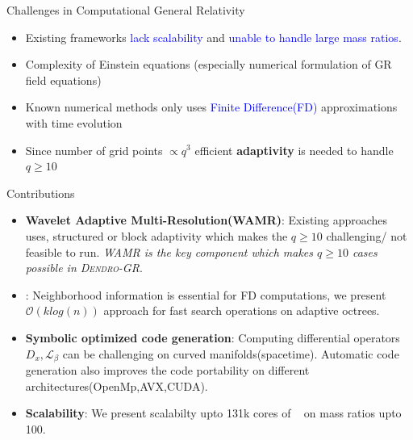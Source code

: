 \documentclass[16pt,xcolor=table]{beamer}
\begin{document}
\begin{frame}{Challenges in Computational General Relativity}
\begin{itemize}
	\item Existing frameworks \textcolor{blue}{lack scalability} and \textcolor{blue}{unable to handle large mass ratios}.
	\item Complexity of Einstein equations (especially numerical formulation of GR field equations)
	\item Known numerical methods only uses \textcolor{blue}{Finite Difference(FD)} approximations with time evolution
	\item Since number of grid points $ \propto q^3$ efficient \textbf{adaptivity} is needed to handle $q\geq 10$
\end{itemize}
\end{frame}

\begin{frame}{Contributions}
\begin{itemize}
	\item \textbf{Wavelet Adaptive Multi-Resolution(WAMR)}: Existing approaches uses, structured or block adaptivity which makes the $q\geq 10$ challenging/ not feasible to run. \textit{WAMR is the key component which makes $q\geq 10$ cases possible in \textsc{Dendro-GR}}.
	\item \textbf{\tsearch}: Neighborhood information is essential for FD computations, we present $\mathcal{O}(klog(n))$ approach for fast search operations on adaptive octrees. 
	\item \textbf{Symbolic optimized code generation}: Computing differential operators $D_x,\mathcal{L}_\beta$ can be challenging on curved manifolds(spacetime). Automatic code generation also improves the code portability on different architectures(OpenMp,AVX,CUDA). 
	\item \textbf{Scalability}: We present scalabilty upto 131k cores of \Titan~ on mass ratios upto 100.
\end{itemize}
\end{frame}
\end{document}
